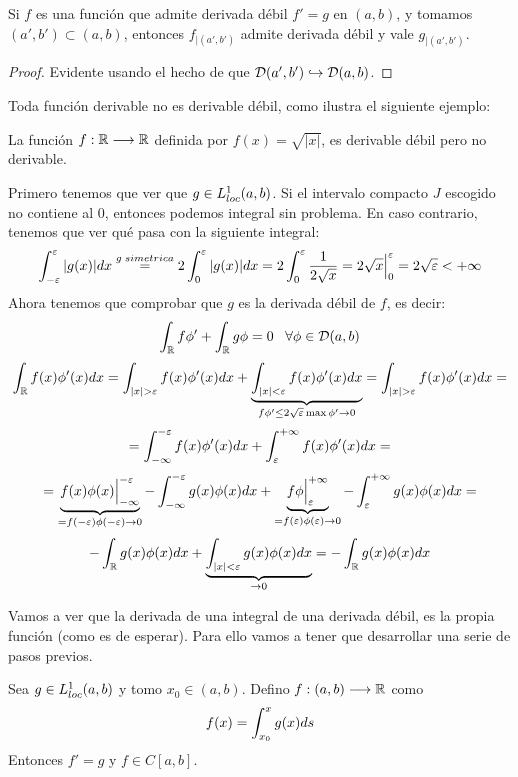 \begin{prop}
Si $f$ es una función que admite derivada débil $f'=g$ en $(a,b)$, y tomamos $(a',b')\subset(a,b)$, entonces $f_{|(a',b')}$ admite derivada débil y vale $g_{|(a',b')}$.
\end{prop}

\begin{proof}
Evidente usando el hecho de que $\mathcal{D}(a',b')\hookrightarrow\mathcal{D}(a,b)$.
\end{proof}

Toda función derivable no es derivable débil, como ilustra el siguiente ejemplo:

\begin{example}
La función $f : \mathbb{R} \longrightarrow \mathbb{R}$ definida por $f(x)=\sqrt{|x|}$, es derivable débil pero no derivable.

Primero tenemos que ver que $g\in L^1_{loc}(a,b)$. Si el intervalo compacto $J$ escogido no contiene al 0, entonces podemos integral sin problema. En caso contrario, tenemos que ver qué pasa con la siguiente integral:
\[
\displaystyle\int_{ -\varepsilon }^{ \varepsilon } |g(x)|dx\overset{g\; simetrica}{=}2\displaystyle\int_{ 0 }^{ \varepsilon } |g(x)|dx=2\displaystyle\int_{ 0 }^{ \varepsilon } \frac{1}{2\sqrt{x}}=2\sqrt{x}\Big|_0^\varepsilon=2\sqrt{\varepsilon}<+\infty
\]
Ahora tenemos que comprobar que $g$ es la derivada débil de $f$, es decir:
\[
\displaystyle\int_{ \mathbb{R} }^{  } f\phi'+\displaystyle\int_{ \mathbb{R} }^{  } g\phi=0 \;\;\; \forall\phi\in\mathcal{D}(a,b)
\]
\[
\integral{\R}{}{f(x)\phi'(x)dx}=\integral{|x|>\varepsilon}{}{f(x)\phi'(x)dx}+\underbrace{\integral{|x|<\varepsilon}{}{f(x)\phi'(x)dx}}_{f\phi'\leq2\sqrt{\varepsilon}\max\phi'\to0}=\integral{|x|>\varepsilon}{}{f(x)\phi'(x)dx}=
\]
\[
=\displaystyle\int_{ -\infty }^{ -\varepsilon } f(x)\phi'(x)dx+\displaystyle\int_{ \varepsilon }^{ +\infty } f(x)\phi'(x)dx=
\]
\[
=\underbrace{f(x)\phi(x)\Big|_{-\infty}^{-\varepsilon}}_{=f(-\varepsilon)\phi(-\varepsilon)\to 0}-
\displaystyle\int_{ -\infty }^{ -\varepsilon } g(x)\phi(x) dx+
\underbrace{f\phi\Big|_{\varepsilon}^{+\infty}}_{{=f(\varepsilon)\phi(\varepsilon)\to 0}}-
\displaystyle\int_{ \varepsilon }^{ +\infty } g(x)\phi(x) dx=
\]
\[
-\displaystyle\int_{ \mathbb{R} }^{  } g(x)\phi(x)dx+\underbrace{\displaystyle\int_{ |x|<\varepsilon }^{  } g(x)\phi(x)dx}_{\to0}=-\displaystyle\int_{ \mathbb{R} }^{  } g(x)\phi(x)dx
\]
\end{example}

Vamos a ver que la derivada de una integral de una derivada débil, es la propia función (como es de esperar). Para ello vamos a tener que desarrollar una serie de pasos previos.

\begin{prop}
Sea $g\in L^1_{loc}(a,b)$ y tomo $x_0\in(a,b)$. Defino $f : (a,b) \longrightarrow \mathbb{R}$ como
\[
f(x)=\displaystyle\int_{ x_0 }^{ x } g(x)ds
\]
Entonces $f'=g$ y $f\in C[a,b]$.
\end{prop}

